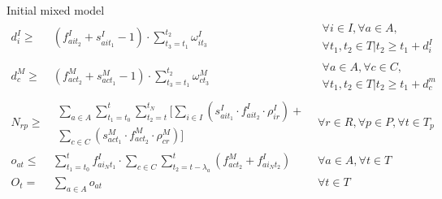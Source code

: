 \documentclass{beamer}
\begin{document}
\begin{frame}{Initial mixed model}
{\begin{align}
d^I_i \geq& (f^I_{ait_2} + s^I_{ait_1} - 1) \cdot \sum_{t_3 = t_1}^{t_2} \omega^I_{it_3} 			& 	\begin{aligned} \forall i \in I, \forall a \in A, \\
																	\forall t_1, t_2 \in T | t_2 \geq t_1 + d^I_i \end{aligned}\\
d^M_c \geq& (f^M_{act_2} + s^M_{act_1} - 1) \cdot \sum_{t_3 = t_1}^{t_2} \omega^M_{ct_3} 			& 	\begin{aligned} \forall a \in A, \forall c \in C, \\
																	\forall t_1, t_2 \in T | t_2 \geq t_1 + d^m_c \end{aligned}\\
N_{rp} \geq& \begin{aligned}\sum_{a\in A} \sum_{t_1 = t_0}^t \sum_{t_2 = t}^{t_N} [ \sum_{i\in I} (s^I_{ait_1} \cdot f^I_{ait_2} \cdot \rho_{ir}^I) + \\ \sum_{c\in C} (s^M_{act_1} \cdot f^M_{act_2} \cdot \rho_{cr}^M) ] \end{aligned}	& 	\forall r \in R, \forall p \in P, \forall t \in T_p 	\\
o_{at} \leq& \sum_{t_1 = t_0}^{t} f^I_{ai_Nt_1} \cdot \sum_{c \in C} \sum_{t_2 = t - \lambda_a}^t (f^M_{act_2} + f^I_{ai_Nt_2})	&	\forall a \in A, \forall t \in T \\
O_t =& \sum_{a \in A} o_{at}													&	\forall t \in T
\end{align} }

\end{frame}
\end{document}
